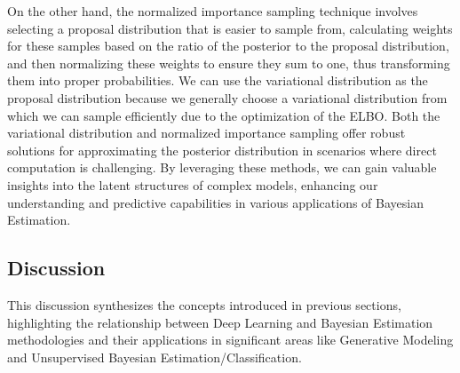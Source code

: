 On the other hand, the normalized importance sampling technique involves selecting 
a proposal distribution that is easier to
sample from, calculating weights for these samples based on the ratio of the
posterior to the proposal distribution, and then normalizing these weights to
ensure they sum to one, thus transforming them into proper probabilities. 
We can use the variational distribution as the proposal
distribution because we generally choose a variational distribution from which
we can sample efficiently due to the optimization of the ELBO.  
Both the variational distribution and normalized importance
sampling offer robust solutions for approximating the posterior distribution
in scenarios where direct computation is challenging. 
By leveraging these methods, we can gain valuable insights into the latent structures of
complex models, enhancing our understanding and predictive capabilities in
various applications of Bayesian Estimation.



\subsection{Discussion}
\label{sub:discussion}

This discussion synthesizes the concepts introduced in previous sections,
highlighting the relationship between Deep Learning and Bayesian Estimation
methodologies and their applications in significant areas like Generative
Modeling and Unsupervised Bayesian Estimation/Classification.

